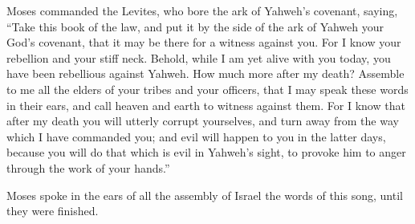 {Moses commanded the Levites, who bore the ark of Yahweh’s covenant, saying,
“Take this book of the law, and put it by the side of the ark of Yahweh your God’s covenant, that it may be there for a witness against you.
For I know your rebellion and your stiff neck. Behold, while I am yet alive with you today, you have been rebellious against Yahweh. How much more after my death?
Assemble to me all the elders of your tribes and your officers, that I may speak these words in their ears, and call heaven and earth to witness against them.
For I know that after my death you will utterly corrupt yourselves, and turn away from the way which I have commanded you; and evil will happen to you in the latter days, because you will do that which is evil in Yahweh’s sight, to provoke him to anger through the work of your hands.”
\par }{\PP {}Moses spoke in the ears of all the assembly of Israel the words of this song, until they were finished.

}
